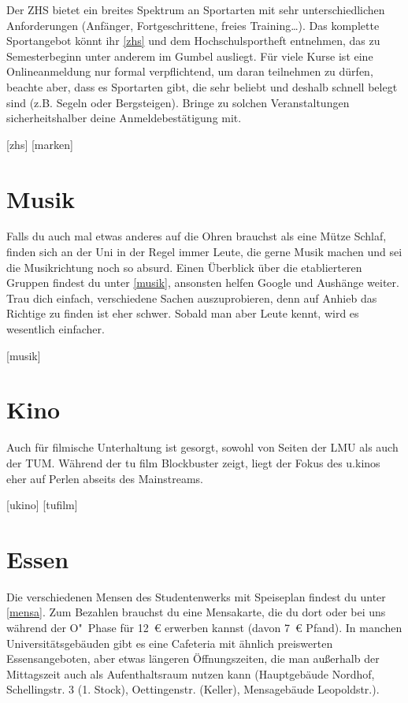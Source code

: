 Der ZHS bietet ein breites Spektrum an Sportarten mit sehr unterschiedlichen
Anforderungen (Anfänger, Fortgeschrittene, freies Training\ldots). Das
komplette Sportangebot könnt ihr \ref{zhs} und dem Hochschulsportheft
entnehmen, das zu Semesterbeginn unter anderem im Gumbel ausliegt. Für viele
Kurse ist eine Onlineanmeldung nur formal verpflichtend, um daran teilnehmen zu
dürfen, beachte aber, dass es Sportarten gibt, die sehr beliebt und deshalb
schnell belegt sind (z.B. Segeln oder Bergsteigen). Bringe zu solchen
Veranstaltungen sicherheitshalber deine Anmeldebestätigung mit.

\begin{urlList}
	[zhs]
	[marken]
\end{urlList}

\section{Musik}
Falls du auch mal etwas anderes auf die Ohren brauchst als eine
Mütze Schlaf, finden sich an der Uni in der Regel immer Leute, die gerne Musik
machen und sei die Musikrichtung noch so absurd. Einen Überblick über die
etablierteren Gruppen findest du unter \ref{musik}, ansonsten helfen Google und
Aushänge weiter. Trau dich einfach, verschiedene Sachen auszuprobieren, denn
auf Anhieb das Richtige zu finden ist eher schwer. Sobald man aber Leute kennt,
wird es wesentlich einfacher.

\begin{urlList}
	[musik]
\end{urlList}

\section{Kino}
Auch für filmische Unterhaltung ist gesorgt, sowohl von Seiten der LMU als auch
der TUM. Während der tu film Blockbuster zeigt, liegt der Fokus des u.kinos
eher auf Perlen abseits des Mainstreams.

\begin{urlList}
	[ukino]
	[tufilm]
\end{urlList}

\section{Essen}
Die verschiedenen Mensen des Studentenwerks mit Speiseplan findest du unter \ref{mensa}. 
Zum Bezahlen brauchst du eine Mensakarte, die du dort oder bei uns während der O"~Phase für 12~€ erwerben kannst (davon 7~€ Pfand). In manchen Universitätsgebäuden gibt es eine Cafeteria mit ähnlich preiswerten Essensangeboten, aber etwas längeren Öffnungszeiten, die man außerhalb der Mittagszeit auch als Aufenthaltsraum nutzen kann (Hauptgebäude Nordhof, Schellingstr. 3 (1. Stock), Oettingenstr. (Keller), Mensagebäude Leopoldstr.).

